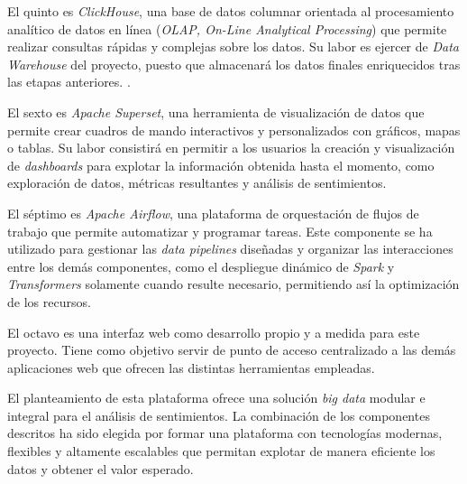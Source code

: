 El quinto es \textit{ClickHouse}, una base de datos columnar orientada al procesamiento analítico de datos en línea (\textit{OLAP, On-Line Analytical Processing}) que permite realizar consultas rápidas y complejas sobre los datos. Su labor es ejercer de \textit{Data Warehouse} del proyecto, puesto que almacenará los datos finales enriquecidos tras las etapas anteriores. .

El sexto es \textit{Apache Superset}, una herramienta de visualización de datos que permite crear cuadros de mando interactivos y personalizados con gráficos, mapas o tablas. Su labor consistirá en permitir a los usuarios la creación y visualización de \textit{dashboards} para explotar la información obtenida hasta el momento, como exploración de datos, métricas resultantes y análisis de sentimientos.

El séptimo es \textit{Apache Airflow}, una plataforma de orquestación de flujos de trabajo que permite automatizar y programar tareas. Este componente se ha utilizado para gestionar las \textit{data pipelines} diseñadas y organizar las interacciones entre los demás componentes, como el despliegue dinámico de \textit{Spark} y \textit{Transformers} solamente cuando resulte necesario, permitiendo así la optimización de los recursos.

El octavo es una interfaz web como desarrollo propio y a medida para este proyecto. Tiene como objetivo servir de punto de acceso centralizado a las demás aplicaciones web que ofrecen las distintas herramientas empleadas.

El planteamiento de esta plataforma ofrece una solución \textit{big data} modular e integral para el análisis de sentimientos. La combinación de los componentes descritos ha sido elegida por formar una plataforma con tecnologías modernas, flexibles y altamente escalables que permitan explotar de manera eficiente los datos y obtener el valor esperado.
